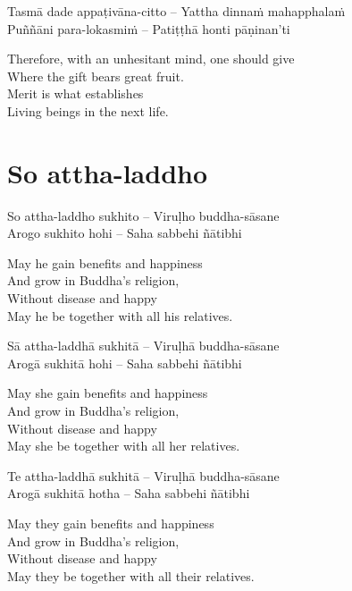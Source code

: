 \begin{twochants}
  Tasmā dade appaṭivāna-citto – Yattha dinnaṁ mahapphalaṁ\\
  Puññāni para-lokasmiṁ – Patiṭṭhā honti pāṇinan'ti
\end{twochants}

\begin{english-verses}
  Therefore, with an unhesitant mind, one should give\\
  Where the gift bears great fruit.\\
  Merit is what establishes\\
  Living beings in the next life.
\end{english-verses}

\suttaRef{[AN 5.36]}

\section{So attha-laddho}
\label{so-attha-laddho}

\begin{twochants}
  So attha-laddho sukhito – Viruḷho buddha-sāsane\\
  Arogo sukhito hohi – Saha sabbehi ñātibhi
\end{twochants}

\begin{english-verses}
  May he gain benefits and happiness\\
  And grow in Buddha's religion,\\
  Without disease and happy\\
  May he be together with all his relatives.
\end{english-verses}

\begin{twochants}
  Sā attha-laddhā sukhitā – Viruḷhā buddha-sāsane\\
  Arogā sukhitā hohi – Saha sabbehi ñātibhi
\end{twochants}

\begin{english-verses}
  May she gain benefits and happiness\\
  And grow in Buddha's religion,\\
  Without disease and happy\\
  May she be together with all her relatives.
\end{english-verses}

\begin{twochants}
  Te attha-laddhā sukhitā – Viruḷhā buddha-sāsane\\
  Arogā sukhitā hotha – Saha sabbehi ñātibhi
\end{twochants}

\begin{english-verses}
  May they gain benefits and happiness\\
  And grow in Buddha's religion,\\
  Without disease and happy\\
  May they be together with all their relatives.
\end{english-verses}

\suttaRef{[AN 3.155]}

